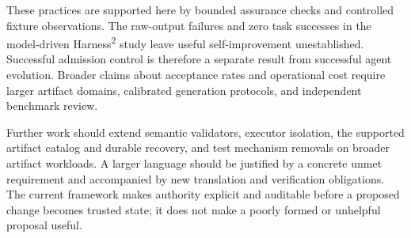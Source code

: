 \IfFileExists{IEEEcsmag.cls}{\publishertrue\documentclass{IEEEcsmag}}{\publisherfalse\documentclass[11pt]{article}}
\begin{document}
These practices are supported here by bounded assurance checks and controlled fixture observations. The raw-output failures and zero task successes in the model-driven Harness\textsuperscript{2} study leave useful self-improvement unestablished. Successful admission control is therefore a separate result from successful agent evolution. Broader claims about acceptance rates and operational cost require larger artifact domains, calibrated generation protocols, and independent benchmark review.

Further work should extend semantic validators, executor isolation, the supported artifact catalog and durable recovery, and test mechanism removals on broader artifact workloads. A larger language should be justified by a concrete unmet requirement and accompanied by new translation and verification obligations. The current framework makes authority explicit and auditable before a proposed change becomes trusted state; it does not make a poorly formed or unhelpful proposal useful.



\end{document}
